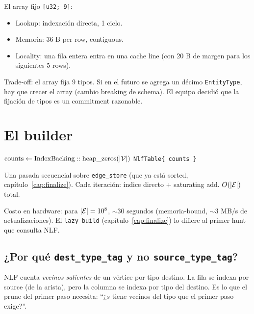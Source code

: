 \noindent
El array fijo \texttt{[u32; 9]}:

\begin{itemize}
    \item Lookup: indexación directa, 1 ciclo.
    \item Memoria: 36 B per row, contiguous.
    \item Locality: una fila entera entra en una cache line (con
    20 B de margen para los siguientes 5 rows).
\end{itemize}

\noindent
Trade-off: el array fija 9 tipos. Si en el futuro se agrega un
décimo \texttt{EntityType}, hay que crecer el array (cambio
breaking de schema). El equipo decidió que la fijación de tipos es
un commitment razonable.

\section{El builder}

\begin{algorithm}[H]
\caption{\texttt{NlfTable::build}}
\(\mathrm{counts} \leftarrow \mathrm{IndexBacking::heap\_zeros}(|\mathcal{V}|)\)\;
\Return \texttt{NlfTable\{ counts \}}\;
\end{algorithm}

\noindent
Una pasada secuencial sobre \texttt{edge\_store} (que ya está
sorted, capítulo~\ref{cap:finalize}). Cada iteración: índice
directo + saturating add. \(O(|\mathcal{E}|)\) total.

Costo en hardware: para \(|\mathcal{E}| = 10^8\), \(\sim 30\) segundos
(memoria-bound, $\sim$3 MB/s de actualizaciones). El \texttt{lazy
build} (capítulo~\ref{cap:finalize}) lo difiere al primer hunt
que consulta NLF.

\subsection{¿Por qué \texttt{dest\_type\_tag} y no \texttt{source\_type\_tag}?}

NLF cuenta \emph{vecinos salientes} de un vértice por tipo destino.
La fila se indexa por source (de la arista), pero la columna se
indexa por tipo del destino. Es lo que el prune del primer paso
necesita: ``¿\(s\) tiene vecinos del tipo que el primer paso
exige?''.

